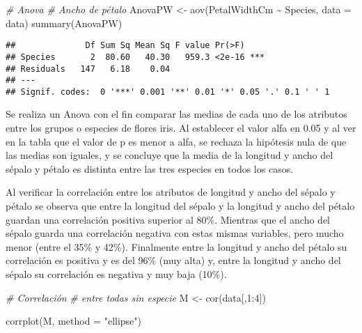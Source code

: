 \documentclass[
]{article}
\newenvironment{Shaded}{\begin{snugshade}}{\end{snugshade}}
\newcommand{\AttributeTok}[1]{\textcolor[rgb]{0.77,0.63,0.00}{#1}}
\newcommand{\CommentTok}[1]{\textcolor[rgb]{0.56,0.35,0.01}{\textit{#1}}}
\newcommand{\DecValTok}[1]{\textcolor[rgb]{0.00,0.00,0.81}{#1}}
\newcommand{\FunctionTok}[1]{\textcolor[rgb]{0.00,0.00,0.00}{#1}}
\newcommand{\NormalTok}[1]{#1}
\newcommand{\OtherTok}[1]{\textcolor[rgb]{0.56,0.35,0.01}{#1}}
\newcommand{\SpecialCharTok}[1]{\textcolor[rgb]{0.00,0.00,0.00}{#1}}
\newcommand{\StringTok}[1]{\textcolor[rgb]{0.31,0.60,0.02}{#1}}
\begin{document}
\begin{Shaded}
\begin{Highlighting}[]
\CommentTok{\# Anova}
\CommentTok{\# Ancho de pétalo}
\NormalTok{AnovaPW }\OtherTok{\textless{}{-}} \FunctionTok{aov}\NormalTok{(PetalWidthCm }\SpecialCharTok{\textasciitilde{}}\NormalTok{ Species, }\AttributeTok{data =}\NormalTok{ data)}
\FunctionTok{summary}\NormalTok{(AnovaPW)}
\end{Highlighting}
\end{Shaded}

\begin{verbatim}
##              Df Sum Sq Mean Sq F value Pr(>F)    
## Species       2  80.60   40.30   959.3 <2e-16 ***
## Residuals   147   6.18    0.04                   
## ---
## Signif. codes:  0 '***' 0.001 '**' 0.01 '*' 0.05 '.' 0.1 ' ' 1
\end{verbatim}

Se realiza un Anova con el fin comparar las medias de cada uno de los
atributos entre los grupos o especies de flores iris. Al establecer el
valor alfa en 0.05 y al ver en la tabla que el valor de p es menor a
alfa, se rechaza la hipótesis nula de que las medias son iguales, y se
concluye que la media de la longitud y ancho del sépalo y pétalo es
distinta entre las tres especies en todos los casos.

Al verificar la correlación entre los atributos de longitud y ancho del
sépalo y pétalo se observa que entre la longitud del sépalo y la
longitud y ancho del pétalo guardan una correlación positiva superior al
80\%. Mientras que el ancho del sépalo guarda una correlación negativa
con estas mismas variables, pero mucho menor (entre el 35\% y 42\%).
Finalmente entre la longitud y ancho del pétalo su correlación es
positiva y es del 96\% (muy alta) y, entre la longitud y ancho del
sépalo su correlación es negativa y muy baja (10\%).

\begin{Shaded}
\begin{Highlighting}[]
\CommentTok{\# Correlación}
\CommentTok{\# entre todas sin especie}
\NormalTok{M }\OtherTok{\textless{}{-}} \FunctionTok{cor}\NormalTok{(data[,}\DecValTok{1}\SpecialCharTok{:}\DecValTok{4}\NormalTok{])}
\end{Highlighting}
\end{Shaded}

\begin{Shaded}
\begin{Highlighting}[]
\FunctionTok{corrplot}\NormalTok{(M, }\AttributeTok{method =} \StringTok{"ellipse"}\NormalTok{)}
\end{Highlighting}
\end{Shaded}
\end{document}
